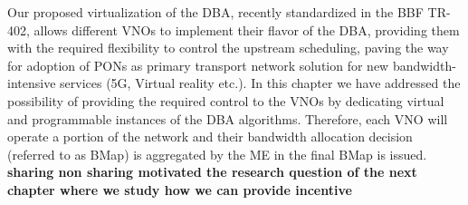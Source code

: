 Our proposed virtualization of the \ac{DBA}, recently standardized in the \ac{BBF} TR-402, allows different \acp{VNO} to implement their flavor of the \ac{DBA}, providing them with the required flexibility to control the upstream scheduling, paving the way for adoption of \acp{PON} as primary transport network solution for new bandwidth-intensive services (\ac{5G}, Virtual reality etc.). In this chapter we have addressed the possibility of providing the required control to the \acp{VNO} by dedicating virtual and programmable instances of the \ac{DBA} algorithms. Therefore, each \ac{VNO} will operate a portion of the network and their bandwidth allocation decision (referred to as \ac{BMap}) is aggregated by the \ac{ME} in the final \ac{BMap} is issued. %
\textbf{sharing non sharing motivated the research question of the next chapter where we study how we can provide incentive
}%
 


